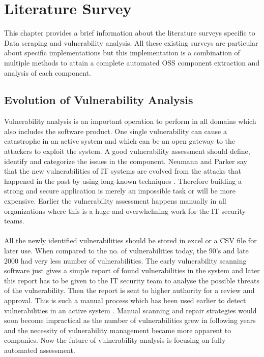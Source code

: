 %
\section{Literature Survey}\label{sec:literature survey}
%
This chapter provides a brief information about the literature surveys specific to Data scraping and vulnerability analysis. All these existing surveys are particular about specific implementations but this implementation is a combination of multiple methods to attain a complete automated OSS component extraction and analysis of each component.
%
\subsection{Evolution of Vulnerability Analysis}
Vulnerability analysis is an important operation to perform in all domains which also includes the software product. One single vulnerability can cause a catastrophe in an active system and which can be an open gateway to the attackers to exploit the system. A good vulnerability assessment should define, identify and categorize the issues in the component. 
Neumann and Parker say that the new vulnerabilities of IT systems are evolved from the attacks that happened in the past by using long-known techniques \cite{NePa1989}. Therefore building a strong and secure application is merely an impossible task or will be more expensive. Earlier the vulnerability assessment happens manually  in all organizations where this is a huge and overwhelming work for the IT security teams. 
\paragraph{}
All the newly identified vulnerabilities should be stored in excel or a CSV file for later use. When compared to the no. of vulnerabilities today, the 90’s and late 2000 had very less number of vulnerabilities. The early vulnerability scanning software just gives a simple report of found vulnerabilities in the system and later this report has to be given to the IT security team to analyse the possible threats of the vulnerability. Then the report is sent to higher authority for a review and approval. This is such a manual process which has been used earlier to detect vulnerabilities in an active system \cite{Rh2019}. Manual scanning and repair strategies would soon become impractical as the number of vulnerabilities grew in following years and the necessity of vulnerability management became more apparent to companies. Now the future of vulnerability analysis is focusing on fully automated assessment.

